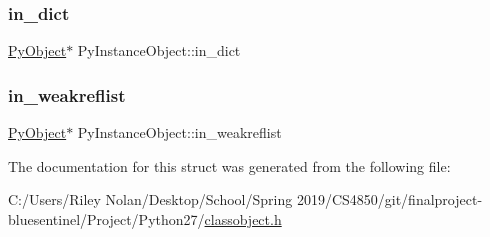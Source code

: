 \subsubsection{\texorpdfstring{in\_dict}{in\_dict}}
{\footnotesize\ttfamily \mbox{\hyperlink{_python27_2object_8h_aadc84ac7aed2cfa6f20c25f62bf3dac7}{Py\+Object}}$\ast$ Py\+Instance\+Object\+::in\+\_\+dict}

\mbox{\label{struct_py_instance_object_ab2da032abfb9112c0b0021afc739a6ef}} 
\subsubsection{\texorpdfstring{in\_weakreflist}{in\_weakreflist}}
{\footnotesize\ttfamily \mbox{\hyperlink{_python27_2object_8h_aadc84ac7aed2cfa6f20c25f62bf3dac7}{Py\+Object}}$\ast$ Py\+Instance\+Object\+::in\+\_\+weakreflist}



The documentation for this struct was generated from the following file\+:\begin{DoxyCompactItemize}
\item 
C\+:/\+Users/\+Riley Nolan/\+Desktop/\+School/\+Spring 2019/\+C\+S4850/git/finalproject-\/bluesentinel/\+Project/\+Python27/\mbox{\hyperlink{classobject_8h}{classobject.\+h}}\end{DoxyCompactItemize}
